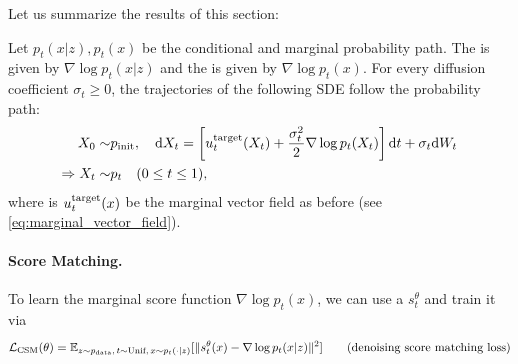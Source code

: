 Let us summarize the results of this section:
\begin{summarybox}
Let $p_t(x|z),p_t(x)$ be the conditional and marginal probability path. The  is given by $\nabla\log p_t(x|z)$ and the  is given by $\nabla\log p_t(x)$. For every diffusion coefficient $\sigma_{t}\geq 0$, the trajectories of the following SDE follow the probability path:
\begin{align}
\label{eq:sde_extension_restated}
X_0\sim&p_{\rm{init}},\quad \mathrm{d} X_t =\left[u^{\text{target}}_t(X_t)+\frac{\sigma_t^2}{2}\nabla\log p_t(X_t)\right]\mathrm{d} t +\sigma_t\mathrm{d} W_t\\
    \Rightarrow X_t\sim& p_t\quad (0\leq t\leq 1),
\end{align}
where is $u^{\text{target}}_t(x)$ be the marginal vector field as before (see \cref{eq:marginal_vector_field}).

\paragraph{Score Matching.} To learn the marginal score function $\nabla\log p_t(x)$, we can use a  $s_t^\theta$ and train it via 
\begin{align}
    \label{eq:dsm}
\mathcal{L}_{\text{CSM}}(\theta) &= \mathbb{E}_{z\sim p_{\rm{data}}, \,t\sim \text{Unif},\,x\sim p_t(\cdot|z)}[\|s_t^\theta(x) - \nabla\log p_t(x|z)\|^2] \quad &(\text{denoising score matching loss})
\end{align}


\end{summarybox}

